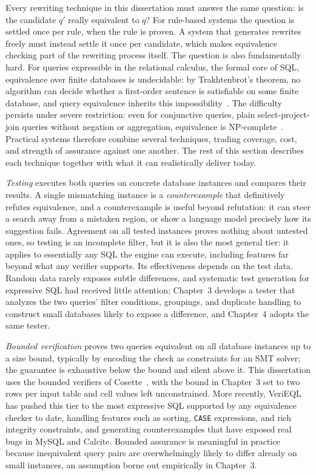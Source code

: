 Every rewriting technique in this dissertation must answer the same
question: is the candidate $q'$ really equivalent to $q$? For
rule-based systems the question is settled once per rule, when the
rule is proven. A system that generates rewrites freely must instead
settle it once per candidate, which makes equivalence checking part
of the rewriting process itself. The question is also fundamentally
hard. For queries expressible in the relational calculus, the formal
core of SQL, equivalence over finite databases is undecidable: by
Trakhtenbrot's theorem, no algorithm can decide whether a
first-order sentence is satisfiable on some finite database, and
query equivalence inherits this
impossibility~\cite{trakhtenbrot1950,abiteboul1995foundations}. The
difficulty persists under severe restriction: even for conjunctive
queries, plain select-project-join queries without negation or
aggregation, equivalence is NP-complete~\cite{chandra1977optimal}.
Practical systems therefore combine several techniques, trading
coverage, cost, and strength of assurance against one another. The
rest of this section describes each technique together with what it
can realistically deliver today.

\emph{Testing} executes both queries on concrete database instances
and compares their results. A single mismatching instance is a
\emph{counterexample} that definitively refutes equivalence, and a
counterexample is useful beyond refutation: it can steer a search
away from a mistaken region, or show a language model precisely how
its suggestion fails. Agreement on all tested instances proves
nothing about untested ones, so testing is an incomplete filter, but
it is also the most general tier: it applies to essentially any SQL
the engine can execute, including features far beyond what any
verifier supports. Its effectiveness depends on the test data.
Random data rarely exposes subtle differences, and systematic test
generation for expressive SQL had received little attention;
Chapter~3 develops a tester that analyzes the two queries' filter
conditions, groupings, and duplicate handling to construct small
databases likely to expose a difference, and Chapter~4 adopts the
same tester.

\emph{Bounded verification} proves two queries equivalent on all
database instances up to a size bound, typically by encoding the
check as constraints for an SMT solver; the guarantee is exhaustive
below the bound and silent above it. This dissertation uses the
bounded verifiers of Cosette~\cite{chu2017cosette,wang2018speeding},
with the bound in Chapter~3 set to two rows per input table and
cell values left unconstrained. More recently,
VeriEQL~\cite{he2024verieql} has pushed this tier to the most
expressive SQL supported by any equivalence checker to date,
handling features such as sorting, \texttt{CASE} expressions, and
rich integrity constraints, and generating counterexamples that
have exposed real bugs in MySQL and Calcite. Bounded assurance is
meaningful in practice because inequivalent query pairs are
overwhelmingly likely to differ already on small instances, an
assumption borne out empirically in Chapter~3.

